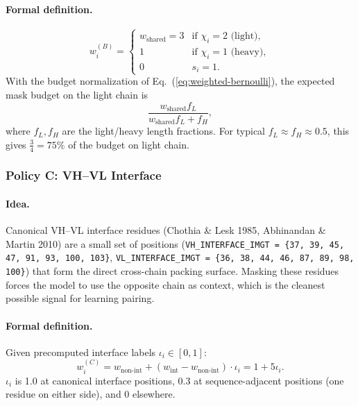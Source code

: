 \documentclass[11pt]{article}
\begin{document}
\paragraph{Formal definition.}
\begin{equation}
w^{(B)}_i =
\begin{cases}
w_{\text{shared}} = 3 & \text{if } \chi_i = 2 \text{ (light)}, \\
1 & \text{if } \chi_i = 1 \text{ (heavy)}, \\
0 & s_i = 1.
\end{cases}
\end{equation}
With the budget normalization of Eq.~(\ref{eq:weighted-bernoulli}), the
expected mask budget on the light chain is
\begin{equation}
\frac{w_{\text{shared}} f_{L}}{w_{\text{shared}} f_{L} + f_{H}},
\end{equation}
where $f_L, f_H$ are the light/heavy length fractions.
For typical $f_L \approx f_H \approx 0.5$, this gives $\tfrac{3}{4}
= 75\%$ of the budget on light chain.

\subsubsection{Policy C: VH--VL Interface}
\paragraph{Idea.} Canonical VH--VL interface residues (Chothia \& Lesk
1985, Abhinandan \& Martin 2010) are a small set of positions
(\texttt{VH\_INTERFACE\_IMGT = \{37, 39, 45, 47, 91, 93, 100, 103\}},
\texttt{VL\_INTERFACE\_IMGT = \{36, 38, 44, 46, 87, 89, 98, 100\}}) that
form the direct cross-chain packing surface. Masking these residues
forces the model to use the opposite chain as context, which is the
cleanest possible signal for learning pairing.

\paragraph{Formal definition.} Given precomputed interface labels
$\iota_i \in [0, 1]$:
\begin{equation}
w^{(C)}_i = w_{\text{non-int}} + (w_{\text{int}} - w_{\text{non-int}}) \cdot \iota_i
= 1 + 5 \iota_i.
\end{equation}
$\iota_i$ is 1.0 at canonical interface positions, $0.3$ at
sequence-adjacent positions (one residue on either side), and 0
elsewhere.
\end{document}
